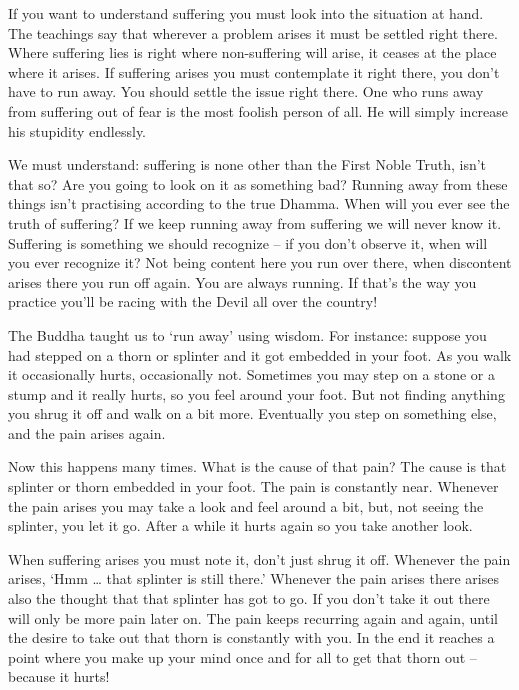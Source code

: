 If you want to understand suffering you must look into the situation at hand. The teachings say that wherever a problem arises it must be settled right there. Where suffering lies is right where non-suffering will arise, it ceases at the place where it arises. If suffering arises you must contemplate it right there, you don't have to run away. You should settle the issue right there. One who runs away from suffering out of fear is the most foolish person of all. He will simply increase his stupidity endlessly. 

We must understand: suffering is none other than the First Noble Truth, isn't that so? Are you going to look on it as something bad?  Running away from these things isn't practising according to the true Dhamma. When will you ever see the truth of suffering? If we keep running away from suffering we will never know it. Suffering is something we should recognize -- if you don't observe it, when will you ever recognize it? Not being content here you run over there, when discontent arises there you run off again. You are always running. If that's the way you practice you'll be racing with the Devil all over the country! 

The Buddha taught us to `run away' using wisdom. For instance: suppose you had stepped on a thorn or splinter and it got embedded in your foot. As you walk it occasionally hurts, occasionally not. Sometimes you may step on a stone or a stump and it really hurts, so you feel around your foot. But not finding anything you shrug it off and walk on a bit more. Eventually you step on something else, and the pain arises again. 

Now this happens many times. What is the cause of that pain? The cause is that splinter or thorn embedded in your foot. The pain is constantly near. Whenever the pain arises you may take a look and feel around a bit, but, not seeing the splinter, you let it go. After a while it hurts again so you take another look. 

When suffering arises you must note it, don't just shrug it off. Whenever the pain arises, `Hmm \ldots{} that splinter is still there.' Whenever the pain arises there arises also the thought that that splinter has got to go. If you don't take it out there will only be more pain later on. The pain keeps recurring again and again, until the desire to take out that thorn is constantly with you. In the end it reaches a point where you make up your mind once and for all to get that thorn out -- because it hurts! 

